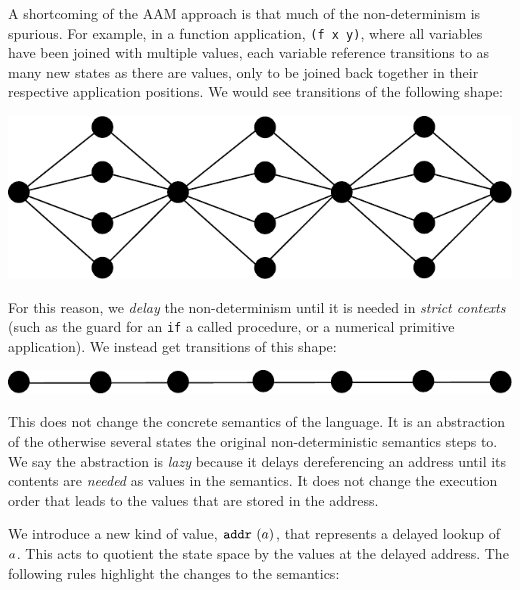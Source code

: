 \documentclass[preprint,onecolumn,9pt]{sigplanconf} %
\begin{document}
A shortcoming of the AAM approach is that much of the non-determinism
is spurious. For example, in a function application, {\tt (f x y)},
where all variables have been joined with multiple values, each
variable reference transitions to as many new states as there are
values, only to be joined back together in their respective
application positions. We would see transitions of the following
shape:
\begin{center}
\includegraphics[scale=0.3]{fanout.pdf}
\end{center}
For this reason, we {\it delay} the non-determinism
until it is needed in {\it strict contexts} (such as the guard for an
{\tt if} a called procedure, or a numerical primitive application). We instead get transitions of this shape:
\begin{center}
\includegraphics[scale=0.3]{lazy.pdf}
\end{center}

This does not change the concrete semantics of the language. It is an
abstraction of the otherwise several states the original
non-deterministic semantics steps to. We say the abstraction is
\emph{lazy} because it delays dereferencing an address until its
contents are \emph{needed} as values in the semantics. It does not
change the execution order that leads to the values that are stored in
the address.

We introduce a new kind of value, ${\tt addr{\ }}({a})$, that represents a
delayed lookup of $a$. This acts to quotient the state space by
the values at the delayed address. The following rules highlight the
changes to the semantics:
\end{document}
